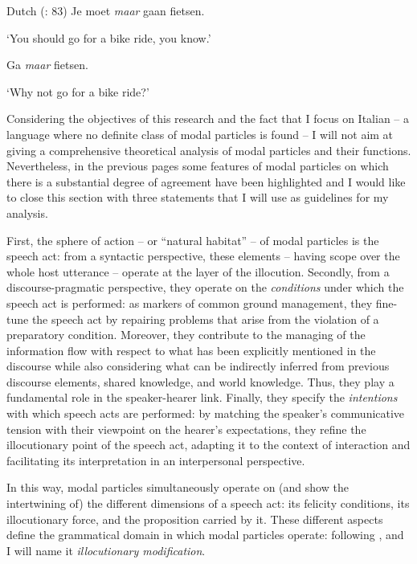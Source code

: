 \ea%
    \label{ex:key:9}

          Dutch (\citealt{HengeveldMackenzie2008}: 83)
\ea  Je moet \textit{maar} gaan fietsen.

\glt ‘You should go for a bike ride, you know.’

\ex  Ga \textit{maar} fietsen.

     ‘Why not go for a bike ride?’
    \z
\z

Considering the objectives of this research and the fact that I focus on Italian – a language where no definite class of modal particles is found – I will not aim at giving a comprehensive theoretical analysis of modal particles and their functions. Nevertheless, in the previous pages some features of modal particles on which there is a substantial degree of agreement have been highlighted and I would like to close this section with three statements that I will use as guidelines for my analysis.

First, the sphere of action – or “natural habitat” – of modal particles is the speech act: from a syntactic perspective, these elements – having scope over the whole host utterance – operate at the layer of the illocution. Secondly, from a discourse-pragmatic perspective, they operate on the \textit{conditions} under which the speech act is performed: as markers of common ground management, they fine-tune the speech act by repairing problems that arise from the violation of a preparatory condition. Moreover, they contribute to the managing of the information flow with respect to what has been explicitly mentioned in the discourse while also considering what can be indirectly inferred from previous discourse elements, shared knowledge, and world knowledge. Thus, they play a fundamental role in the speaker-hearer link. Finally, they specify the \textit{intentions} with which speech acts are performed: by matching the speaker’s communicative tension with their viewpoint on the hearer’s expectations, they refine the illocutionary point of the speech act, adapting it to the context of interaction and facilitating its interpretation in an interpersonal perspective.

In this way, modal particles simultaneously operate on (and show the intertwining of) the different dimensions of a speech act: its felicity conditions, its illocutionary force, and the proposition carried by it. These different aspects define the grammatical domain in which modal particles operate: following \citet[1192]{Hengeveld2004}, \citet[22--25]{Waltereit2006} and \citet[13]{Narrog2012} I will name it \textit{illocutionary modification}.


